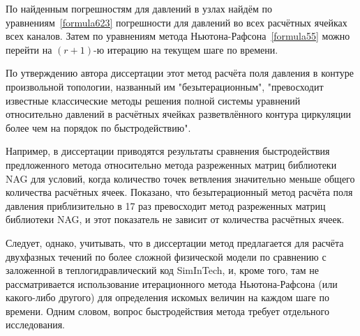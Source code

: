 По найденным погрешностям для давлений в узлах найдём по уравнениям~\eqref{formula623} погрешности для давлений во всех расчётных ячейках всех каналов. Затем по уравнениям метода Ньютона-Рафсона~\eqref{formula55} можно перейти на $(r+1)$-ю итерацию на текущем шаге по времени.

По утверждению автора диссертации \cite{DisserKORSAR} этот метод расчёта поля давления в контуре произвольной топологии, названный им "безытерационным"{}, "превосходит известные классические методы решения полной системы уравнений относительно давлений в расчётных ячейках разветвлённого контура циркуляции более чем на порядок по быстродействию".  
 
Например, в диссертации приводятся результаты сравнения быс\-тро\-дей\-стви\-я пре\-дло\-жен\-но\-го метода относительно метода разреженных матриц библиотеки NAG для условий, когда количество точек ветвления значительно меньше общего количества расчётных ячеек. Показано, что безытерационный метод расчёта поля давления приблизительно в 17 раз превосходит метод разреженных матриц библиотеки NAG, и этот показатель не зависит от количества расчётных ячеек.

Следует, однако, учитывать, что в диссертации метод предлагается для расчёта двухфазных течений по более сложной физической модели по сравнению с заложенной в теплогидравлический код SimInTech, и, кроме того, там не рассматривается использование итерационного метода Ньютона-Рафсона (или какого-либо другого) для определения искомых величин на каждом шаге по времени. Одним словом, вопрос быстродействия метода требует отдельного исследования.    






 




